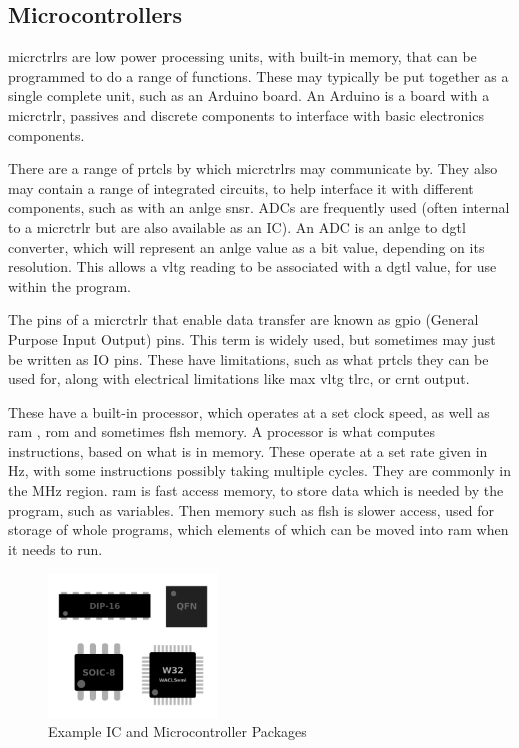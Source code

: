 \documentclass[a4paper,11pt]{report}
\begin{document}
\subsection{Microcontrollers}

\gls{micrctrlr}s are low power processing units, with built-in memory, that can be programmed to do a range of functions. These may typically be put together as a single complete unit, such as an Arduino board. An Arduino is a board with a \gls{micrctrlr}, passives and discrete components to interface with basic electronics components.

There are a range of \gls{prtcl}s by which \gls{micrctrlr}s may communicate by. They also may contain a range of integrated circuits, to help interface it with different components, such as with an \gls{anlge} \gls{snsr}. ADCs are frequently used (often internal to a \gls{micrctrlr} but are also available as an IC). An ADC is an \gls{anlge} to \gls{dgtl} converter, which will represent an \gls{anlge} value as a bit value, depending on its resolution. This allows a \gls{vltg} reading to be associated with a \gls{dgtl} value, for use within the program.

The pins of a \gls{micrctrlr} that enable data transfer are known as \gls{gpio} (General Purpose Input Output) pins. This term is widely used, but sometimes may just be written as IO pins. These have limitations, such as what \gls{prtcl}s they can be used for, along with electrical limitations like max \gls{vltg} \gls{tlrc}, or \gls{crnt} output.

These have a built-in processor, which operates at a set clock speed, as well as \gls{ram} , \gls{rom}  and sometimes  \gls{flsh}  memory. A processor is what computes instructions, based on what is in memory. These operate at a set rate given in Hz, with some instructions possibly taking multiple cycles. They are commonly in the MHz region. \gls{ram} is fast access memory, to store data which is needed by the program, such as variables. Then memory such as  \gls{flsh}  is slower access, used for storage of whole programs, which elements of which can be moved into \gls{ram} when it needs to run.

\begin{figure}[H]
\centering
\includegraphics[width=0.4\textwidth]{icpackages}
\caption{Example IC and Microcontroller Packages}
\end{figure}
\end{document}

